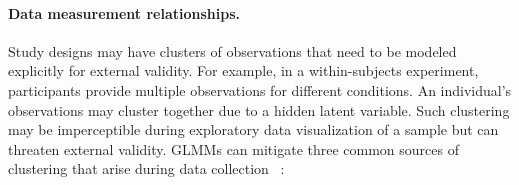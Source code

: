 \figureSDSLToGraphIR




\paragraph{Data measurement relationships.}\label{sec:data-measurement-relationships}

Study designs may have clusters of observations that need to be modeled explicitly for external validity.
For example, in a within-subjects experiment, participants provide multiple
observations for different conditions. An individual's observations may cluster
together due to a hidden latent variable. Such clustering may be imperceptible
during exploratory data visualization of a sample but can threaten external validity.
GLMMs can mitigate three common sources of clustering that
arise during data collection
~\cite{gelmanHill2006regression,kreft1998introducing,cohen1988statistical}:

